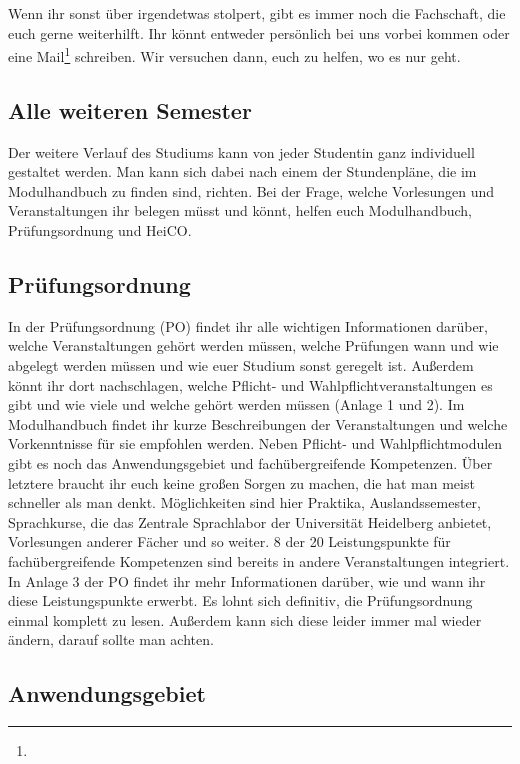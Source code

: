 Wenn ihr sonst über irgendetwas stolpert, gibt es immer noch die Fachschaft, die euch gerne weiterhilft. Ihr könnt entweder persönlich bei uns vorbei kommen oder eine Mail\footnote{} schreiben. Wir versuchen dann, euch zu helfen, wo es nur geht.

\subsection{Alle weiteren Semester}

Der weitere Verlauf des Studiums kann von jeder Studentin ganz individuell gestaltet werden. Man kann sich dabei nach einem der Stundenpläne, die im Modulhandbuch zu finden sind, richten. Bei der Frage, welche Vorlesungen und Veranstaltungen ihr belegen müsst und könnt, helfen euch Modulhandbuch, Prüfungsordnung und HeiCO.

\subsection{Prüfungsordnung}

In der Prüfungsordnung (\gls{PO}) findet ihr alle wichtigen Informationen darüber, welche Veranstaltungen gehört werden müssen, welche Prüfungen wann und wie abgelegt werden müssen und wie euer Studium sonst geregelt ist. Außerdem könnt ihr dort nachschlagen, welche Pflicht- und Wahlpflichtveranstaltungen es gibt und wie viele und welche gehört werden müssen (Anlage 1 und 2).  Im Modulhandbuch findet ihr kurze Beschreibungen der Veranstaltungen und welche Vorkenntnisse für sie empfohlen werden. Neben Pflicht- und Wahlpflichtmodulen gibt es noch das Anwendungsgebiet und fachübergreifende Kompetenzen. Über letztere braucht ihr euch keine großen Sorgen zu machen, die hat man meist schneller als man denkt. Möglichkeiten sind hier Praktika, Auslandssemester, Sprachkurse, die das Zentrale Sprachlabor der Universität Heidelberg anbietet, Vorlesungen anderer Fächer und so weiter. 8 der 20 Leistungspunkte für fachübergreifende Kompetenzen sind bereits in andere Veranstaltungen integriert. In Anlage 3 der PO findet ihr mehr Informationen darüber, wie und wann ihr diese Leistungspunkte erwerbt. Es lohnt sich definitiv, die Prüfungsordnung einmal komplett zu lesen. Außerdem kann sich diese leider immer mal wieder ändern, darauf sollte man achten.

\subsection{Anwendungsgebiet}


